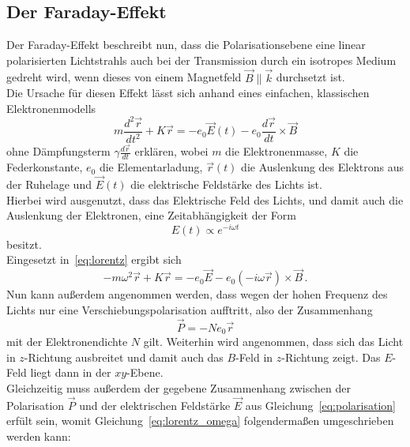 \subsection{Der Faraday-Effekt}

Der Faraday-Effekt beschreibt nun, dass die Polarisationsebene eine linear polarisierten Lichtstrahls auch bei der Transmission durch ein isotropes Medium gedreht wird, wenn dieses von einem Magnetfeld $\vec{B} \parallel \vec{k}$ durchsetzt ist. \\

Die Ursache für diesen Effekt lässt sich anhand eines einfachen, klassischen Elektronenmodells 
\begin{equation}
    m\frac{d^2\vec{r}}{dt^2} + K\vec{r} = -e_0 \vec{E}(t) - e_0 \frac{d\vec{r}}{dt} \times \vec{B}
    \label{eq:lorentz}
\end{equation}
ohne Dämpfungsterm $\gamma \frac{d\vec{r}}{dt}$ erklären, wobei $m$ die Elektronenmasse, $K$ die Federkonstante, $e_0$ die Elementarladung, $\vec{r}(t)$ die Auslenkung des Elektrons aus der Ruhelage und $\vec{E}(t)$ die elektrische Feldstärke des Lichts ist. \\
Hierbei wird ausgenutzt, dass das Elektrische Feld des Lichts, und damit auch die Auslenkung der Elektronen, eine Zeitabhängigkeit der Form
\begin{equation}
    E(t) \propto e^{-i\omega t}
\end{equation}
besitzt. \\
Eingesetzt in~\eqref{eq:lorentz} ergibt sich 
\begin{equation}
    -m\omega^2 \vec{r} + K\vec{r} = -e_0 \vec{E} - e_0 (-i\omega \vec{r}) \times \vec{B} \, .
    \label{eq:lorentz_omega}
\end{equation}
Nun kann außerdem angenommen werden, dass wegen der hohen Frequenz des Lichts nur eine Verschiebungspolarisation aufftritt, also der Zusammenhang
\begin{equation}
    \vec{P} = -N e_0 \vec{r}
\end{equation}
mit der Elektronendichte $N$ gilt.
Weiterhin wird angenommen, dass sich das Licht in $z$-Richtung ausbreitet und damit auch das $B$-Feld in $z$-Richtung zeigt. Das $E$-Feld liegt dann in der $xy$-Ebene.\\ 
Gleichzeitig muss außerdem der gegebene Zusammenhang zwischen der Polarisation $\vec{P}$ und der elektrischen Feldstärke $\vec{E}$ aus Gleichung~\eqref{eq:polarisation} erfült sein, womit Gleichung~\eqref{eq:lorentz_omega} folgendermaßen umgeschrieben werden kann:
